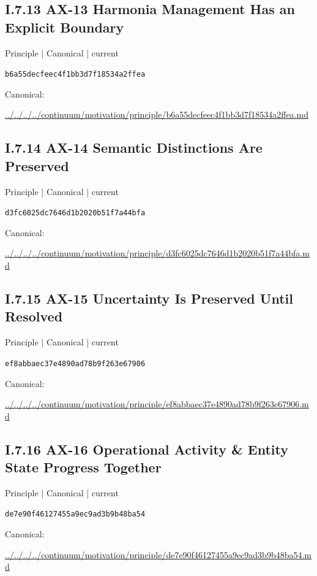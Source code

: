 \documentclass[10pt,a4paper]{article}
\begin{document}
\subsection*{I.7.13 AX-13 Harmonia Management Has an Explicit Boundary}
\label{element-b6a55decfeec4f1bb3d7f18534a2ffea}
{\small Principle | Canonical | current}\par
\texttt{b6a55decfeec4f1bb3d7f18534a2ffea}\par
Canonical: \par
{\footnotesize\url{../../../../continuum/motivation/principle/b6a55decfeec4f1bb3d7f18534a2ffea.md}}\par
\subsection*{I.7.14 AX-14 Semantic Distinctions Are Preserved}
\label{element-d3fc6025dc7646d1b2020b51f7a44bfa}
{\small Principle | Canonical | current}\par
\texttt{d3fc6025dc7646d1b2020b51f7a44bfa}\par
Canonical: \par
{\footnotesize\url{../../../../continuum/motivation/principle/d3fc6025dc7646d1b2020b51f7a44bfa.md}}\par
\subsection*{I.7.15 AX-15 Uncertainty Is Preserved Until Resolved}
\label{element-ef8abbaec37e4890ad78b9f263e67906}
{\small Principle | Canonical | current}\par
\texttt{ef8abbaec37e4890ad78b9f263e67906}\par
Canonical: \par
{\footnotesize\url{../../../../continuum/motivation/principle/ef8abbaec37e4890ad78b9f263e67906.md}}\par
\subsection*{I.7.16 AX-16 Operational Activity \& Entity State Progress Together}
\label{element-de7e90f46127455a9ec9ad3b9b48ba54}
{\small Principle | Canonical | current}\par
\texttt{de7e90f46127455a9ec9ad3b9b48ba54}\par
Canonical: \par
{\footnotesize\url{../../../../continuum/motivation/principle/de7e90f46127455a9ec9ad3b9b48ba54.md}}\par
\end{document}
